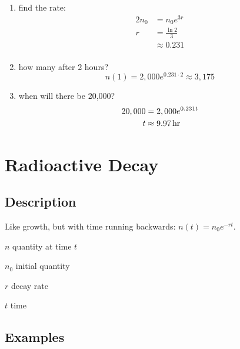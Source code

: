 \documentclass{exam}
\begin{document}
\begin{enumerate}
      \begin{enumerate}[a]
        \item find the rate:
          \begin{align*}
            2n_0 & = n_0 e^{3r} \\
            r    & = \frac{\ln 2}{3} \\
                 & \approx 0.231 \\
          \end{align*}

        \item how many after 2 hours?
          \[
            n(1) = 2,000 e^{0.231 \cdot 2} \approx 3,175
          \]

        \item when will there be 20,000?
          \begin{align*}
            20,000 & = 2,000 e^{0.231 t} \\
            t      & \approx \unit[9.97]{hr} \\
          \end{align*}

      \end{enumerate}
      
  \end{enumerate}

  \section{Radioactive Decay}

  \subsection{Description}
  Like growth, but with time running backwards: $n(t) = n_0 e^{-rt}$.

  \begin{itemize*}
    \item $n$ quantity at time $t$
    \item $n_0$ initial quantity
    \item $r$ decay rate
    \item $t$ time
  \end{itemize*}

  \subsection{Examples}
\end{document}
